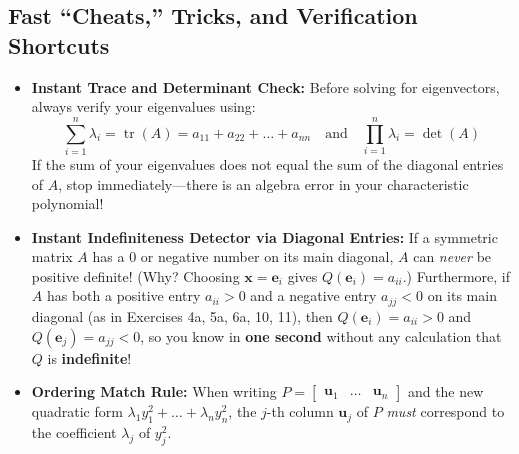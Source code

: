 \documentclass[11pt, letterpaper]{article}
\theoremstyle{definition}
\theoremstyle{remark}
\begin{document}
\subsection{Fast ``Cheats,'' Tricks, and Verification Shortcuts}
\begin{itemize}
    \item \textbf{Instant Trace and Determinant Check:} Before solving for eigenvectors, always verify your eigenvalues using:
    \[
    \sum_{i=1}^n \lambda_i = \operatorname{tr}(A) = a_{11} + a_{22} + \dots + a_{nn} \quad \text{and} \quad \prod_{i=1}^n \lambda_i = \det(A)
    \]
    If the sum of your eigenvalues does not equal the sum of the diagonal entries of $A$, stop immediately---there is an algebra error in your characteristic polynomial!
    \item \textbf{Instant Indefiniteness Detector via Diagonal Entries:} If a symmetric matrix $A$ has a $0$ or negative number on its main diagonal, $A$ can \textit{never} be positive definite! (Why? Choosing $\mathbf{x} = \mathbf{e}_i$ gives $Q(\mathbf{e}_i) = a_{ii}$.) Furthermore, if $A$ has both a positive entry $a_{ii} > 0$ and a negative entry $a_{jj} < 0$ on its main diagonal (as in Exercises 4a, 5a, 6a, 10, 11), then $Q(\mathbf{e}_i) = a_{ii} > 0$ and $Q(\mathbf{e}_j) = a_{jj} < 0$, so you know in \textbf{one second} without any calculation that $Q$ is \textbf{indefinite}!
    \item \textbf{Ordering Match Rule:} When writing $P = \begin{bmatrix} \mathbf{u}_1 & \dots & \mathbf{u}_n \end{bmatrix}$ and the new quadratic form $\lambda_1 y_1^2 + \dots + \lambda_n y_n^2$, the $j$-th column $\mathbf{u}_j$ of $P$ \textit{must} correspond to the coefficient $\lambda_j$ of $y_j^2$.
\end{itemize}
\end{document}
